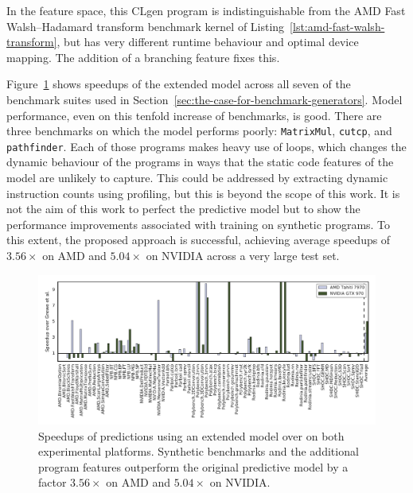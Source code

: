 \begin{listing}
  \inputminted{opencl_lexer.py:OpenCLLexer -x}{lst/amd-fast-walsh-transform-equivalent.cl}
  \caption[Synthesised program with same features as an AMD benchmark]{In the \citeauthor{Grewe2013} feature space, this CLgen program is indistinguishable from the AMD Fast Walsh–Hadamard transform benchmark kernel of Listing~\ref{lst:amd-fast-walsh-transform}, but has very different runtime behaviour and optimal device mapping. The addition of a branching feature fixes this.}
  \label{lst:zero-b}
\end{listing}

\newpage
Figure~\ref{fig:ex2} shows speedups of the extended model across all seven of the benchmark suites used in Section~\ref{sec:the-case-for-benchmark-generators}. Model performance, even on this tenfold increase of benchmarks, is good. There are three benchmarks on which the model performs poorly: \texttt{MatrixMul}, \texttt{cutcp}, and \texttt{pathfinder}. Each of those programs makes heavy use of loops, which changes the dynamic behaviour of the programs in ways that the static code features of the model are unlikely to capture. This could be addressed by extracting dynamic instruction counts using profiling, but this is beyond the scope of this work. It is not the aim of this work to perfect the predictive model but to show the performance improvements associated with training on synthetic programs. To this extent, the proposed approach is successful, achieving average speedups of $3.56\times$ on AMD and $5.04\times$ on NVIDIA across a very large test set.

\begin{figure}
  \centering%
  \includegraphics[width=1.45\textwidth,angle=270]{img/ex2}%
  \caption[Speedups of predictions using extended model over state-of-the-art]{%
    Speedups of predictions using an extended model over \citeauthor{Grewe2013} on both experimental platforms. Synthetic benchmarks and the additional program features outperform the original predictive model by a factor $3.56\times$ on AMD and $5.04\times$ on NVIDIA.%
  }%
  \label{fig:ex2}%
\end{figure}


